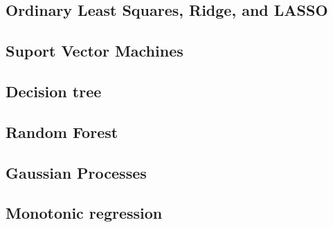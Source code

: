 \subsection{Ordinary Least Squares, Ridge, and LASSO}
\subsection{Suport Vector Machines}
\subsection{Decision tree}
\subsection{Random Forest}
\subsection{Gaussian Processes}
\subsection{Monotonic regression}


